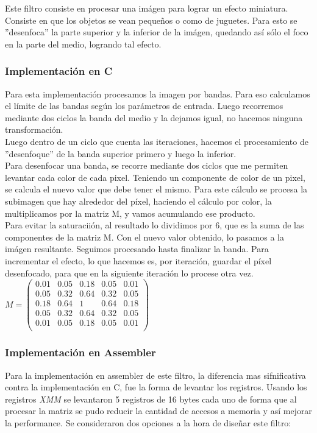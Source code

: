 Este filtro consiste en procesar una im\'agen para lograr un efecto miniatura. Consiste en que los objetos se vean pequeños o como de juguetes. Para esto se ''desenfoca'' la parte superior y la inferior de la im\'agen, quedando as\'i s\'olo el foco en la parte del medio, logrando tal efecto.



\subsubsection{Implementación en C}
Para esta implementaci\'on procesamos la imagen por bandas.
Para eso calculamos el límite de las bandas seg\'un los par\'ametros de entrada. Luego recorremos mediante dos ciclos la banda del medio y la dejamos igual, no hacemos ninguna transformaci\'on.\\
Luego dentro de un ciclo que cuenta las iteraciones, hacemos el procesamiento de ''desenfoque'' de la banda superior primero y luego la inferior.\\
Para desenfocar una banda, se recorre mediante dos ciclos que me permiten levantar cada color de cada pixel. Teniendo un componente de color de un pixel, se calcula el nuevo valor que debe tener el mismo. Para este c\'alculo se procesa la subimagen que hay alrededor del píxel, haciendo el c\'alculo por color, la multiplicamos por la matriz M, y vamos acumulando ese producto.\\
Para evitar la saturacii\'on, al resultado lo dividimos por 6, que es la suma de las componentes de la matriz M. Con el nuevo valor obtenido, lo pasamos a la im\'agen resultante. Seguimos procesando hasta finalizar la banda.
Para incrementar el efecto, lo que hacemos es, por iteraci\'on, guardar el p\'ixel desenfocado, para que en la siguiente iteración lo procese otra vez.\\

$M = \begin{pmatrix}
  0.01 & 0.05 & 0.18 & 0.05 & 0.01 \\
  0.05 & 0.32 & 0.64 & 0.32 & 0.05 \\
  0.18 & 0.64 & 1 & 0.64 & 0.18 \\
  0.05 & 0.32 & 0.64 & 0.32 & 0.05 \\
  0.01 & 0.05 & 0.18 & 0.05 & 0.01 \\
 \end{pmatrix}$

\subsubsection{Implementación en Assembler}
Para la implementaci\'on en assembler de este filtro, la diferencia mas sifnificativa contra la implementaci\'on en C, fue la forma de levantar los registros.
Usando los registros \emph{XMM} se levantaron 5 registros de 16 bytes cada uno de forma que al procesar la matriz se pudo reducir la cantidad de accesos a
 memoria y as\'i mejorar la performance. Se consideraron dos opciones a la hora de diseñar este filtro:\newline

